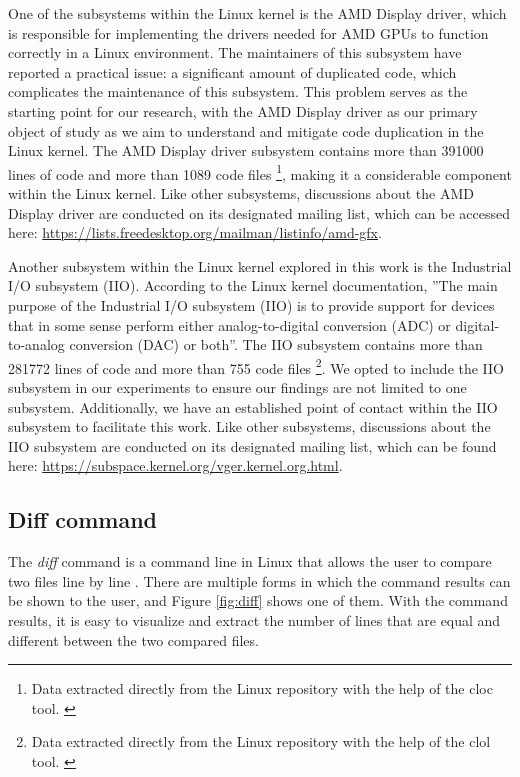 One of the subsystems within the Linux kernel is the AMD Display driver, which
is responsible for implementing the drivers needed for AMD GPUs to function
correctly in a Linux environment. The maintainers of this subsystem have
reported a practical issue: a significant amount of duplicated code, which
complicates the maintenance of this subsystem. This problem serves as the
starting point for our research, with the AMD Display driver as our primary
object of study as we aim to understand and mitigate code duplication in the
Linux kernel. The AMD Display driver subsystem contains more than 391000 lines 
of code and more than 1089 code files
\footnote{ 
Data extracted directly from the Linux repository with the help of the cloc tool.
\citep{cloc}
}, 
making it a considerable component within the Linux kernel. Like other 
subsystems, discussions about the AMD Display driver are conducted on its 
designated mailing list, which can be accessed here: 
\url{https://lists.freedesktop.org/mailman/listinfo/amd-gfx}.

Another subsystem within the Linux kernel explored in this work is the
Industrial I/O subsystem (IIO). According to the Linux kernel documentation, 
''The main purpose of the Industrial I/O subsystem (IIO) is to provide support 
for devices that in some sense perform either analog-to-digital conversion (ADC) 
or digital-to-analog conversion (DAC) or both''\citep{iiodoc}. The IIO subsystem 
contains more than 281772 lines of code and more than 755 code files
\footnote{
Data extracted directly from the Linux repository with the help of the clol tool. \citep{cloc}
}.
We opted to include the IIO subsystem in our experiments to ensure our findings 
are not limited to one subsystem. Additionally, we have an established point of
contact within the IIO subsystem to facilitate this work.
Like other subsystems, discussions about the IIO subsystem are conducted on its 
designated mailing list, which can be found here: 
\url{https://subspace.kernel.org/vger.kernel.org.html}.


\subsection{Diff command}

The \textit{diff} command is a command line in Linux that allows the user to compare 
two files line by line \citep{diffcommand}. There are multiple forms in which the command 
results can be shown to the user, and Figure \ref{fig:diff} shows one of them. 
With the command results, it is easy to visualize and extract the number of lines that 
are equal and different between the two compared files.

